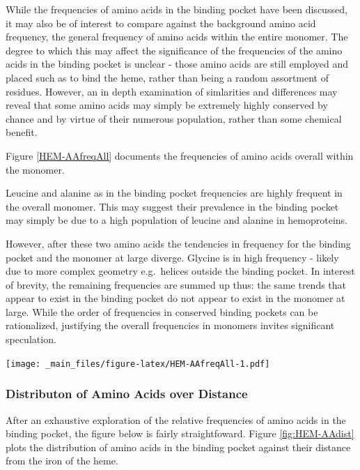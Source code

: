 \documentclass[a4paper, nobind]{templates/ociamthesis}
\let\origfigure\figure
\let\endorigfigure\endfigure
\renewenvironment{figure}[1][2] {
    \expandafter\origfigure\expandafter[H]
} {
    \endorigfigure
}
\begin{document}
While the frequencies of amino acids in the binding pocket have been discussed, it may also be of interest to compare against the background amino acid frequency, the general frequency of amino acids within the entire monomer. The degree to which this may affect the significance of the frequencies of the amino acids in the binding pocket is unclear - those amino acids are still employed and placed such as to bind the heme, rather than being a random assortment of residues. However, an in depth examination of simlarities and differences may reveal that some amino acids may simply be extremely highly conserved by chance and by virtue of their numerous population, rather than some chemical benefit.

Figure \ref{HEM-AAfreqAll} documents the frequencies of amino acids overall within the monomer.

Leucine and alanine as in the binding pocket frequencies are highly frequent in the overall monomer. This may suggest their prevalence in the binding pocket may simply be due to a high population of leucine and alanine in hemoproteins.

However, after these two amino acids the tendencies in frequency for the binding pocket and the monomer at large diverge.
Glycine is in high frequency - likely due to more complex geometry e.g.~helices outside the binding pocket. In interest of brevity, the remaining frequencies are summed up thus: the same trends that appear to exist in the binding pocket do not appear to exist in the monomer at large. While the order of frequencies in conserved binding pockets can be rationalized, justifying the overall frequencies in monomers invites significant speculation.

\begin{figure}
\centering
\texttt{[image: \_main\_files/figure-latex/HEM-AAfreqAll-1.pdf]}
\caption{\label{fig:HEM-AAfreqAll}HEM: AA Frequency of Monomer}
\end{figure}

\hypertarget{distributon-of-amino-acids-over-distance}{%
\subsubsection{Distributon of Amino Acids over Distance}\label{distributon-of-amino-acids-over-distance}}

After an exhaustive exploration of the relative frequencies of amino acids in the binding pocket, the figure below is fairly straightfoward. Figure \ref{fig:HEM-AAdist} plots the distribution of amino acids in the binding pocket against their distance from the iron of the heme.
\end{document}
